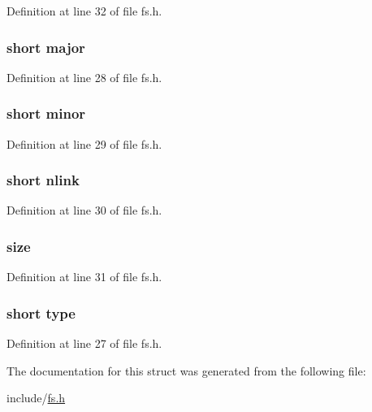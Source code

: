 Definition at line 32 of file fs.\-h.

\hypertarget{structdinode_abe2b53edb36f3d674f052ab7254d4a3e}{
\subsubsection[{major}]{\setlength{\rightskip}{0pt plus 5cm}short major}}\label{structdinode_abe2b53edb36f3d674f052ab7254d4a3e}


Definition at line 28 of file fs.\-h.

\hypertarget{structdinode_adb75a8841fbdda3cb4f2373edac4f1dc}{
\subsubsection[{minor}]{\setlength{\rightskip}{0pt plus 5cm}short minor}}\label{structdinode_adb75a8841fbdda3cb4f2373edac4f1dc}


Definition at line 29 of file fs.\-h.

\hypertarget{structdinode_aa7e1ed70907ed9a2fc9c9a7c24cd0d4d}{
\subsubsection[{nlink}]{\setlength{\rightskip}{0pt plus 5cm}short nlink}}\label{structdinode_aa7e1ed70907ed9a2fc9c9a7c24cd0d4d}


Definition at line 30 of file fs.\-h.

\hypertarget{structdinode_a22d26304a3b3aca97e6311f6939dd1bf}{
\subsubsection[{size}]{ size}}\label{structdinode_a22d26304a3b3aca97e6311f6939dd1bf}


Definition at line 31 of file fs.\-h.

\hypertarget{structdinode_acd579dfd50a9ea905ca697ed8707bf3b}{
\subsubsection[{type}]{\setlength{\rightskip}{0pt plus 5cm}short type}}\label{structdinode_acd579dfd50a9ea905ca697ed8707bf3b}


Definition at line 27 of file fs.\-h.



The documentation for this struct was generated from the following file\-:\begin{DoxyCompactItemize}
\item 
include/\hyperlink{fs_8h}{fs.\-h}\end{DoxyCompactItemize}
